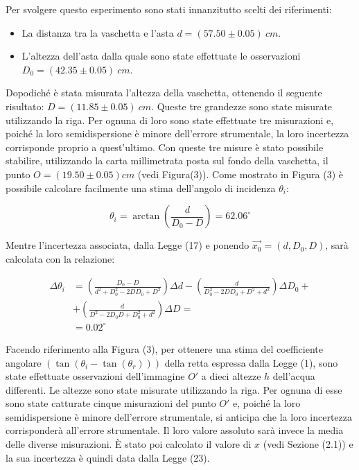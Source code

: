 Per svolgere questo esperimento sono stati innanzitutto scelti dei riferimenti:
\begin{itemize}
	\item La distanza tra la vaschetta e l'asta $d=(57.50\pm0.05)\ cm$.
	\item L'altezza dell'asta dalla quale sono state effettuate le osservazioni $D_0=(42.35\pm0.05)\ cm$.
\end{itemize}
Dopodiché è stata misurata l'altezza della vaschetta, ottenendo il seguente risultato: $D=(11.85\pm0.05)\ cm$. Queste tre grandezze sono state misurate utilizzando la riga. Per ognuna di loro sono state effettuate tre misurazioni e, poiché la loro semidispersione è minore dell'errore strumentale, la loro incertezza corrisponde proprio a quest'ultimo. Con queste tre misure è stato possibile stabilire, utilizzando la carta millimetrata posta sul fondo della vaschetta, il punto $O=(19.50\pm0.05) cm$ (vedi Figura(3)). Come mostrato in Figura (3) è possibile calcolare facilmente una stima dell'angolo di incidenza $\theta_i$:

\begin{equation}
	\theta_i=\arctan(\frac{d}{D_0-D})=62.06^{\circ}
\end{equation}

Mentre l'incertezza associata, dalla Legge (17) e ponendo $\vec{x_0}=(d,D_0,D)$, sarà calcolata con la relazione:

\begin{align}
	\Delta\theta_i&=\left(\frac{D_0-D}{d^2+D_0^2-2DD_0+D^2}\right)\Delta d-\left(\frac{d}{D_0^2-2DD_0+D^2+d^2}\right)\Delta D_0 + \\
    &+\left(\frac{d}{D^2-2D_0D+D_0^2+d^2}\right)\Delta D= \\ &=0.02^{\circ}
\end{align}

Facendo riferimento alla Figura (3), per ottenere una stima del coefficiente angolare $(\tan(\theta_i-\tan(\theta_r)))$ della retta espressa dalla Legge (1), sono state effettuate osservazioni dell'immagine $O'$ a dieci altezze $h$ dell'acqua differenti. Le altezze sono state misurate utilizzando la riga. Per ognuna di esse sono state catturate cinque misurazioni del punto $O'$ e, poiché la loro semidispersione è minore dell'errore strumentale, si anticipa che la loro incertezza corrisponderà all'errore strumentale. Il loro valore assoluto sarà invece la media delle diverse misurazioni. È stato poi calcolato il valore di $x$ (vedi Sezione (2.1)) e la sua incertezza è quindi data dalla Legge (23).

